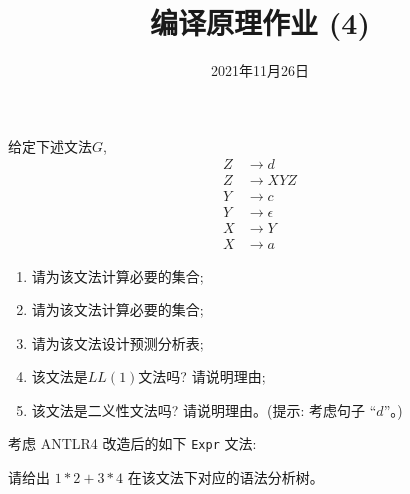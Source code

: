 \documentclass[a4paper, justified]{tufte-handout}
\title{编译原理作业 (4)}
\date{2021年11月26日}
\begin{document}
\maketitle
\noplagiarism %
\begin{abstract}
\end{abstract}
\beginrequired

\begin{problem}[\score{10 = 3 + 3 + 2 + 1 + 1}]
  给定下述文法$G$,
  \begin{align}
    Z &\to d \\[8pt]
    Z &\to XYZ \\[8pt]
    Y &\to c \\[8pt]
    Y &\to \epsilon \\[8pt]
    X &\to Y \\[8pt]
    X &\to a
  \end{align}

  \begin{enumerate}[(1)]
    \item 请为该文法计算必要的\first{}集合;
    \item 请为该文法计算必要的\follow{}集合;
    \item 请为该文法设计预测分析表;
    \item 该文法是$LL(1)$文法吗? 请说明理由;
    \item 该文法是二义性文法吗? 请说明理由。({提示: 考虑句子 ``$d$''}。)
  \end{enumerate}
\end{problem}

\begin{solution}
\end{solution}

\pagebreak
\begin{problem}[\score{10 = 3 + 3 + 2 + 1 + 1}]
  考虑 ANTLR4 改造后的如下 \texttt{Expr} 文法:


  请给出 $1 \ast 2 + 3 \ast 4$ 在该文法下对应的语法分析树。
\end{problem}
\end{document}
